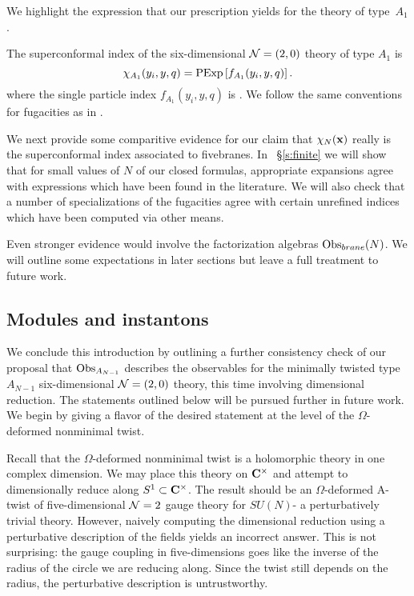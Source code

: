We highlight the expression that our prescription yields for the theory of type~$A_{1}$.

\begin{conj}\label{conj:6dtwo}
The superconformal index of the six-dimensional $\mathcal N=(2,0)$ theory of type $A_1$ is
\[
\chi_{A_1} (y_i,y,q) = {\rm PExp} \left[f_{A_1}(y_i,y,q) \right] .
\]
where the single particle index $f_{A_1}(y_i,y,q)$ is
\beqn\label{eqn:A1}
.
\eeqn
We follow the same conventions for fugacities as in \cite{Kim:2013nva}.
\end{conj}

We next provide some comparitive evidence for our claim that $\chi_N({\bf x})$ really is the superconformal index associated to fivebranes.
In ~\S\ref{s:finite} we will show that for small values of $N$ of our closed formulas, appropriate expansions agree with expressions which have been found in the literature.
We will also check that a number of specializations of the fugacities agree with certain unrefined indices which have been computed via other means.

Even stronger evidence would involve the factorization algebras $\operatorname{Obs}_{brane}(N)$. We will outline some expectations in later sections but leave a full treatment to future work.

\subsection{Modules and instantons}
We conclude this introduction by outlining a further consistency check of our proposal that $\operatorname{Obs}_{A_{N-1}}$ describes the observables for the minimally twisted type $A_{N-1}$ six-dimensional $\mathcal N=(2,0)$ theory, this time involving dimensional reduction. The statements outlined below will be pursued further in future work. We begin by giving a flavor of the desired statement at the level of the $\Omega$-deformed nonminimal twist.

Recall that the $\Omega$-deformed nonminimal twist is a holomorphic theory in one complex dimension. We may place this theory on $\mathbf{C}^{\times}$ and attempt to dimensionally reduce along $S^{1}\subset \mathbf{C}^{\times}$. The result should be an $\Omega$-deformed A-twist of five-dimensional $\mathcal N =2$ gauge theory for $SU(N)$- a perturbatively trivial theory. However, naively computing the dimensional reduction using a perturbative description of the fields yields an incorrect answer. This is not surprising: the gauge coupling in five-dimensions goes like the inverse of the radius of the circle we are reducing along. Since the twist still depends on the radius, the perturbative description is untrustworthy.


